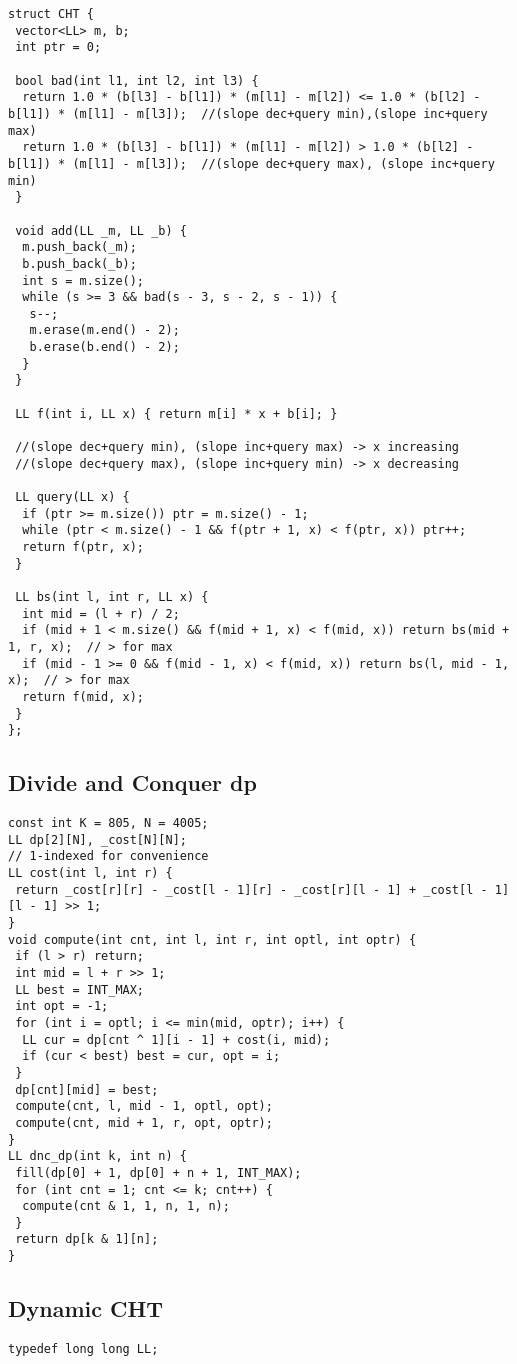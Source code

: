 \documentclass[a4paper,11pt,oneside]{article}
\begin{document}
\begin{multicols*}{\COLS}
\begin{lstlisting}
struct CHT {
 vector<LL> m, b;
 int ptr = 0;

 bool bad(int l1, int l2, int l3) {
  return 1.0 * (b[l3] - b[l1]) * (m[l1] - m[l2]) <= 1.0 * (b[l2] - b[l1]) * (m[l1] - m[l3]);  //(slope dec+query min),(slope inc+query max)
  return 1.0 * (b[l3] - b[l1]) * (m[l1] - m[l2]) > 1.0 * (b[l2] - b[l1]) * (m[l1] - m[l3]);  //(slope dec+query max), (slope inc+query min)
 }

 void add(LL _m, LL _b) {
  m.push_back(_m);
  b.push_back(_b);
  int s = m.size();
  while (s >= 3 && bad(s - 3, s - 2, s - 1)) {
   s--;
   m.erase(m.end() - 2);
   b.erase(b.end() - 2);
  }
 }

 LL f(int i, LL x) { return m[i] * x + b[i]; }

 //(slope dec+query min), (slope inc+query max) -> x increasing
 //(slope dec+query max), (slope inc+query min) -> x decreasing

 LL query(LL x) {
  if (ptr >= m.size()) ptr = m.size() - 1;
  while (ptr < m.size() - 1 && f(ptr + 1, x) < f(ptr, x)) ptr++;
  return f(ptr, x);
 }

 LL bs(int l, int r, LL x) {
  int mid = (l + r) / 2;
  if (mid + 1 < m.size() && f(mid + 1, x) < f(mid, x)) return bs(mid + 1, r, x);  // > for max
  if (mid - 1 >= 0 && f(mid - 1, x) < f(mid, x)) return bs(l, mid - 1, x);  // > for max
  return f(mid, x);
 }
};
\end{lstlisting}
\subsection{Divide and Conquer dp}
\begin{lstlisting}
const int K = 805, N = 4005;
LL dp[2][N], _cost[N][N];
// 1-indexed for convenience
LL cost(int l, int r) {
 return _cost[r][r] - _cost[l - 1][r] - _cost[r][l - 1] + _cost[l - 1][l - 1] >> 1;
}
void compute(int cnt, int l, int r, int optl, int optr) {
 if (l > r) return;
 int mid = l + r >> 1;
 LL best = INT_MAX;
 int opt = -1;
 for (int i = optl; i <= min(mid, optr); i++) {
  LL cur = dp[cnt ^ 1][i - 1] + cost(i, mid);
  if (cur < best) best = cur, opt = i;
 }
 dp[cnt][mid] = best;
 compute(cnt, l, mid - 1, optl, opt);
 compute(cnt, mid + 1, r, opt, optr);
}
LL dnc_dp(int k, int n) {
 fill(dp[0] + 1, dp[0] + n + 1, INT_MAX);
 for (int cnt = 1; cnt <= k; cnt++) {
  compute(cnt & 1, 1, n, 1, n);
 }
 return dp[k & 1][n];
}
\end{lstlisting}
\subsection{Dynamic CHT}
\begin{lstlisting}
typedef long long LL;


\end{lstlisting}
\end{multicols*}
\end{document}
